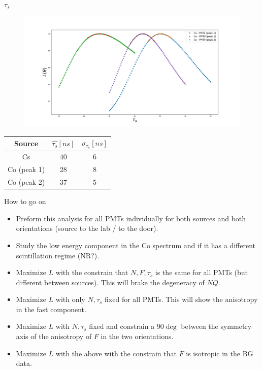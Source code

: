 \documentclass{beamer}
\begin{document}
\begin{frame}{$\tau_s$}
\begin{figure}[h]
\includegraphics[width=1\linewidth]{Ts.png}
\end{figure}

\begin{center}
\begin{tabular}{ |c| c| c|}
\hline
 Source & $\hat{\tau_s} [ns]$ & $\sigma_{\tau_s} [ns]$\\ 
\hline
Cs & 40 & 6\\  
\hline  
Co (peak 1) & 28 & 8\\  
\hline  
Co (peak 2) & 37 & 5\\ 
\hline
\end{tabular}
\end{center}
\end{frame}

\begin{frame}{How to go on}
\begin{itemize}
\item Preform this analysis for all PMTs individually for both sources and both orientations (source to the lab / to the door).
\item Study the low energy component in the Co spectrum and if it has a different scintillation regime (NR?).
\item Maximize $L$ with the constrain that $N, F, \tau_s $ is the same for all PMTs (but different between sources). This will brake the degeneracy of $NQ$.
\item Maximize $L$ with only $N, \tau_s$ fixed for all PMTs. This will show the anisotropy in the fast component.
\item Maximize $L$ with $N, \tau_s$ fixed and constrain a $90\deg$ between the symmetry axis of the anisotropy of $F$ in the two orientations.
\item Maximize $L$ with the above with the constrain that $F$ is isotropic in the BG data. 
\end{itemize}
\end{frame}
\end{document}

